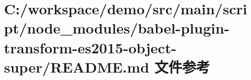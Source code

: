 \hypertarget{node__modules_2babel-plugin-transform-es2015-object-super_2_r_e_a_d_m_e_8md}{}\section{C\+:/workspace/demo/src/main/script/node\+\_\+modules/babel-\/plugin-\/transform-\/es2015-\/object-\/super/\+R\+E\+A\+D\+ME.md 文件参考}
\label{node__modules_2babel-plugin-transform-es2015-object-super_2_r_e_a_d_m_e_8md}
